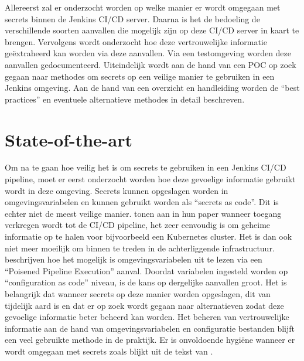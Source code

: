 Allereerst zal er onderzocht worden op welke manier er wordt omgegaan met secrets binnen de Jenkins CI/CD server. Daarna is het de bedoeling de verschillende soorten aanvallen die mogelijk zijn op deze CI/CD server in kaart te brengen. Vervolgens wordt onderzocht hoe deze vertrouwelijke informatie geëxtraheerd kan worden via deze aanvallen. Via een testomgeving worden deze aanvallen gedocumenteerd. Uiteindelijk wordt aan de hand van een POC op zoek gegaan naar methodes om secrets op een veilige manier te gebruiken in een Jenkins omgeving. Aan de hand van een overzicht en handleiding worden de “best practices” en eventuele alternatieve methodes in detail beschreven.

\section{State-of-the-art}%
\label{sec:state-of-the-art}

Om na te gaan hoe veilig het is om secrets te gebruiken in een Jenkins CI/CD pipeline, moet er eerst onderzocht worden hoe deze gevoelige informatie gebruikt wordt in deze omgeving. Secrets kunnen opgeslagen worden in omgevingsvariabelen en kunnen gebruikt worden als “secrets as code”. Dit is echter niet de meest veilige manier. \textcite{Pecka2022} tonen aan in hun paper wanneer toegang verkregen wordt tot de CI/CD pipeline, het zeer eenvoudig is om geheime informatie op te halen voor bijvoorbeeld een Kubernetes cluster. Het is dan ook niet meer moeilijk om binnen te treden in de achterliggende infrastructuur. \textcite{Gil} beschrijven hoe het mogelijk is omgevingsvariabelen uit te lezen via een “Poisened Pipeline Execution” aanval. Doordat variabelen ingesteld worden op “configuration as code” niveau, is de kans op dergelijke aanvallen groot. Het is belangrijk dat wanneer secrets op deze manier worden opgeslagen, dit van tijdelijk aard is en dat er op zoek wordt gegaan naar alternatieven zodat deze gevoelige informatie beter beheerd kan worden. Het beheren van vertrouwelijke informatie aan de hand van omgevingsvariabelen en configuratie bestanden blijft een veel gebruikte methode in de praktijk. Er is onvoldoende hygiëne wanneer er wordt omgegaan met secrets zoals blijkt uit de tekst van \autocite{Gil}. 

